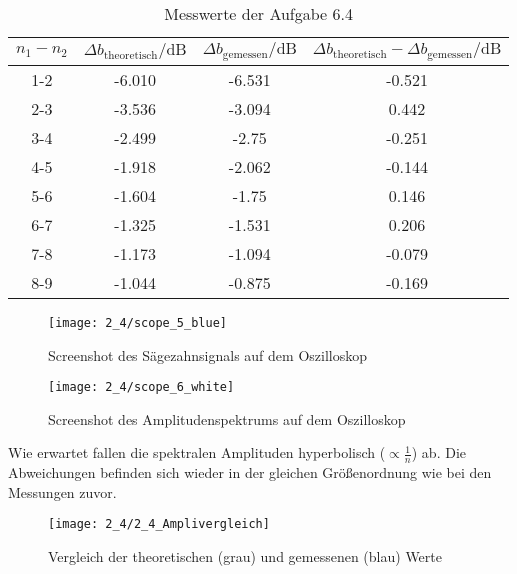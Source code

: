 \documentclass[a4paper, 12pt]{article}
\begin{document}
\begin{table}[H]
	\begin{center}
		\begin{tabular}{@{}cccc@{}}
			\toprule
			$n_1-n_2$ & $\Delta b_{\textrm{theoretisch}} / \si{\deci\bel}$ & $\Delta b_{\textrm{gemessen}} / \si{\deci\bel}$ & $\Delta b_{\textrm{theoretisch}} - \Delta b_{\textrm{gemessen}}/ \si{\deci\bel}$  \\ \midrule
			1-2       &  -6.010                       & -6.531                         &   -0.521         \\
			2-3       &  -3.536                       & -3.094                        &   0.442         \\
			3-4       &  -2.499                       & -2.75                         &   -0.251         \\
			4-5       &  -1.918                       & -2.062                         &   -0.144         \\
			5-6       &  -1.604                       & -1.75                       & 0.146         \\
			6-7       &  -1.325                      & -1.531                      &     0.206       \\
			7-8       &  -1.173                       & -1.094                         &   -0.079         \\
			8-9       &  -1.044                       & -0.875                        &  -0.169          \\ \bottomrule
		\end{tabular}
		\caption{Messwerte der Aufgabe 6.4}
	\end{center}
\end{table}

\begin{figure}[H]
  \texttt{[image: 2\_4/scope\_5\_blue]}
  \caption{Screenshot des Sägezahnsignals auf dem Oszilloskop}
\end{figure}

\begin{figure}[H]
  \texttt{[image: 2\_4/scope\_6\_white]}
  \caption{Screenshot des Amplitudenspektrums auf dem Oszilloskop}
\end{figure}

\noindent Wie erwartet fallen die spektralen Amplituden hyperbolisch ($\propto \frac{1}{n}$) ab. Die Abweichungen befinden sich wieder in der gleichen Größenordnung wie bei den Messungen zuvor. 

\begin{figure}[H]
  \texttt{[image: 2\_4/2\_4\_Amplivergleich]}
  \caption{Vergleich der theoretischen (grau) und gemessenen (blau) Werte }
\end{figure}
\end{document}
